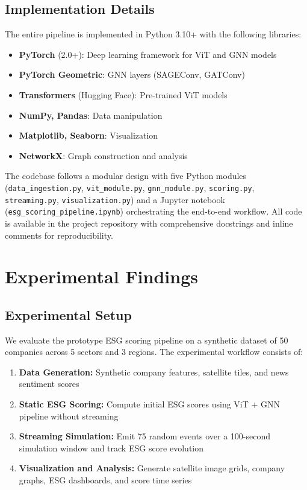 \subsection{Implementation Details}

The entire pipeline is implemented in Python 3.10+ with the following libraries:
\begin{itemize}
\item \textbf{PyTorch} (2.0+): Deep learning framework for ViT and GNN models
\item \textbf{PyTorch Geometric}: GNN layers (SAGEConv, GATConv)
\item \textbf{Transformers} (Hugging Face): Pre-trained ViT models
\item \textbf{NumPy, Pandas}: Data manipulation
\item \textbf{Matplotlib, Seaborn}: Visualization
\item \textbf{NetworkX}: Graph construction and analysis
\end{itemize}

The codebase follows a modular design with five Python modules (\texttt{data\_ingestion.py}, \texttt{vit\_module.py}, \texttt{gnn\_module.py}, \texttt{scoring.py}, \texttt{streaming.py}, \texttt{visualization.py}) and a Jupyter notebook (\texttt{esg\_scoring\_pipeline.ipynb}) orchestrating the end-to-end workflow. All code is available in the project repository with comprehensive docstrings and inline comments for reproducibility.

\clearpage
\section{Experimental Findings}
\label{sec:findings}

\subsection{Experimental Setup}

We evaluate the prototype ESG scoring pipeline on a synthetic dataset of 50 companies across 5 sectors and 3 regions. The experimental workflow consists of:

\begin{enumerate}
\item \textbf{Data Generation:} Synthetic company features, satellite tiles, and news sentiment scores
\item \textbf{Static ESG Scoring:} Compute initial ESG scores using ViT + GNN pipeline without streaming
\item \textbf{Streaming Simulation:} Emit 75 random events over a 100-second simulation window and track ESG score evolution
\item \textbf{Visualization and Analysis:} Generate satellite image grids, company graphs, ESG dashboards, and score time series
\end{enumerate}

